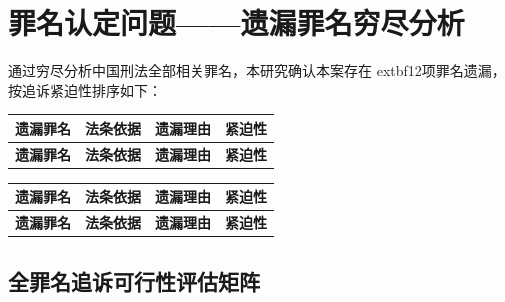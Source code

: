 \documentclass[11pt,a4paper,oneside]{article}
\begin{document}
\section{罪名认定问题——遗漏罪名穷尽分析}通过穷尽分析中国刑法全部相关罪名，本研究确认本案存在	extbf{12项罪名遗漏}，按追诉紧迫性排序如下：\begin{longtable}{|p{2.8cm}|p{3.5cm}|p{4.5cm}|p{2.2cm}|}
\toprule
\textbf{遗漏罪名} & \textbf{法条依据} & \textbf{遗漏理由} & \textbf{紧迫性} \\
\midrule
\endfirsthead
\textbf{遗漏罪名} & \textbf{法条依据} & \textbf{遗漏理由} & \textbf{紧迫性} \\
\midrule
\endhead
\bottomrule
\end{longtable}
\begin{longtable}{|p{2.8cm}|p{3.5cm}|p{4.5cm}|p{2.2cm}|}
\toprule
\textbf{遗漏罪名} & \textbf{法条依据} & \textbf{遗漏理由} & \textbf{紧迫性} \\
\midrule\endfirsthead
\textbf{遗漏罪名} & \textbf{法条依据} & \textbf{遗漏理由} & \textbf{紧迫性} \\
\midrule\endhead
\bottomrule\end{longtable}\subsection{全罪名追诉可行性评估矩阵}
\end{document}
